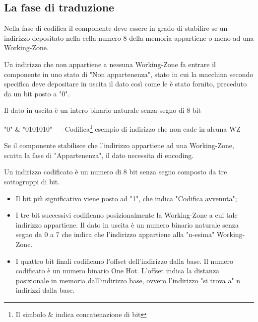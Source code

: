 \documentclass{article}
\newenvironment{gitFont}{\fontfamily{zi4}\selectfont}{\par}
\begin{document}
\subsection{La fase di traduzione}
\begin{flushleft}

Nella fase di codifica il componente deve essere in grado di stabilire se un indirizzo depositato nella cella numero 8 della memoria appartiene o meno ad una Working-Zone.

\medskip

Un indirizzo che non appartiene a nessuna Working-Zone fa entrare il componente in uno stato di "Non appartenenza", stato in cui la macchina secondo specifica deve depositare in uscita il dato così come le è stato fornito, preceduto da un bit posto a "0".
\smallskip

Il dato in uscita è un intero binario naturale senza segno di 8 bit

\bigskip

\begin{gitFont}

"0" \& "0101010"  \ \  --Codifica\footnote{Il simbolo \& indica concatenazione di bit} esempio di indirizzo che non cade in alcuna WZ

\end{gitFont}

\bigskip

Se il componente stabilisce che l'indirizzo appartiene ad una Working-Zone, scatta la fase di "Appartenenza", il dato necessita di encoding.
\smallskip

Un indirizzo codificato è un numero di 8 bit senza segno composto da tre sottogruppi di bit.

\begin{itemize}
\item Il bit più significativo viene posto ad "1", che indica "Codifica avvenuta";
\item I tre bit successivi codificano posizionalmente la Working-Zone a cui tale indirizzo appartiene. Il dato in uscita è un numero binario naturale senza segno da 0 a 7 che indica che l'indirizzo appartiene alla "n-esima" Working-Zone.

\newpage

\item I quattro bit finali codificano l'offset dell'indirizzo dalla base. Il numero codificato è un numero binario One Hot. L'offset indica la distanza posizionale in memoria dall'indirizzo base, ovvero l'indirizzo "si trova a" n indirizzi dalla base.  %
\end{itemize}


\end{flushleft}
\end{document}
